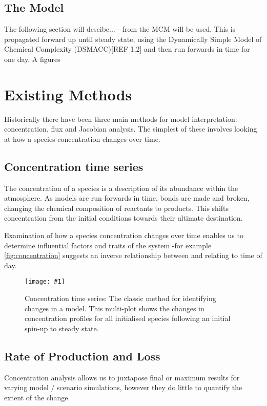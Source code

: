 \documentclass[twoside,reqno]{article}
\newcommand{\ch}[1]{\MakeUppercase{\ce{#1}}}  %
\newcommand{\qfig}[4]{\begin{figure}[H]\centering\texttt{[image: \#1]}\caption{#3}\label{#2}\end{figure}\newpage}
\begin{document}
\subsection{The Model}

The following section will descibe...
- from the MCM will be used. This is propagated forward up until steady state, using the Dynamically Simple Model of Chemical Complexity (DSMACC)[REF 1,2] and then run forwards in time for one day. A figures

\section{Existing Methods}

Historically there have been three main methods for model interpretation: concentration, flux and Jacobian analysis. The simplest of these involves looking at how a species concentration changes over time.


\subsection{Concentration time series}

The concentration of a species is a description of its abundance within the atmosphere. As models are run forwards in time, bonds are made and broken, changing the chemical composition of reactants to products. This shifts concentration from the initial conditions towards their ultimate destination.

Examination of how a species concentration changes over time enables us to determine influential factors and traits of the system -for example  \autoref{fig:concentration} suggests an inverse relationship between \ch{NO2} and \ch{NO} relating to time of day.


\qfig{figures/ch2concentration.pdf}{fig:concentration}{Concentration time series: The classic method for identifying changes in a model. This multi-plot shows the changes in concentration profiles for all initialised species following an initial spin-up to steady state. }{.8\textwidth}

\subsection{Rate of Production and Loss}

Concentration analysis allows us to juxtapose final or maximum results for varying model / scenario simulations, however they do little to quantify the extent of the change.
\end{document}
